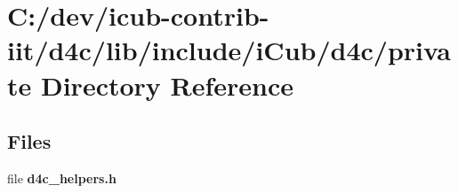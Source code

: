 \section{C\+:/dev/icub-\/contrib-\/iit/d4c/lib/include/i\+Cub/d4c/private Directory Reference}
\label{dir_09e2a23e449987cffac722db893737cc}
\subsection*{Files}
\begin{DoxyCompactItemize}
\item 
file {\bfseries d4c\+\_\+helpers.\+h}
\end{DoxyCompactItemize}
